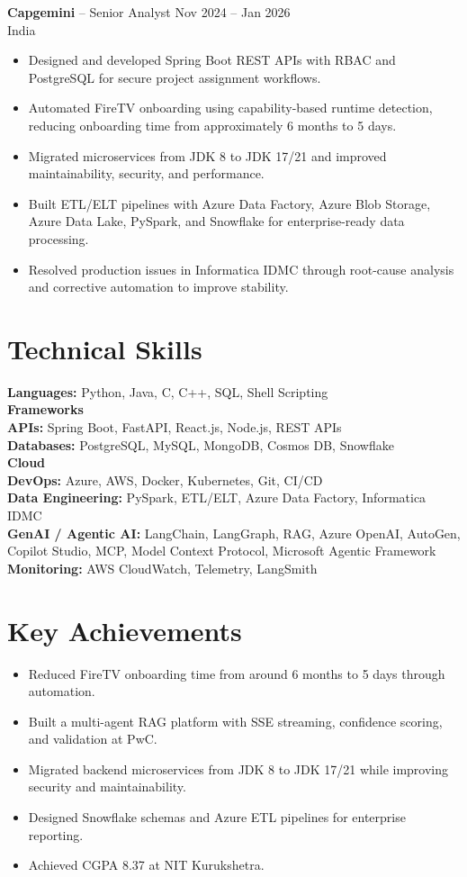 \documentclass[11pt,a4paper]{article}
\begin{document}
\textbf{Capgemini} -- Senior Analyst \hfill Nov 2024 -- Jan 2026\\
India
\begin{itemize}
    \item Designed and developed Spring Boot REST APIs with RBAC and PostgreSQL for secure project assignment workflows.
    \item Automated FireTV onboarding using capability-based runtime detection, reducing onboarding time from approximately 6 months to 5 days.
    \item Migrated microservices from JDK 8 to JDK 17/21 and improved maintainability, security, and performance.
    \item Built ETL/ELT pipelines with Azure Data Factory, Azure Blob Storage, Azure Data Lake, PySpark, and Snowflake for enterprise-ready data processing.
    \item Resolved production issues in Informatica IDMC through root-cause analysis and corrective automation to improve stability.
\end{itemize}

\section*{Technical Skills}
\textbf{Languages:} Python, Java, C, C++, SQL, Shell Scripting\\
\textbf{Frameworks \\ APIs:} Spring Boot, FastAPI, React.js, Node.js, REST APIs\\
\textbf{Databases:} PostgreSQL, MySQL, MongoDB, Cosmos DB, Snowflake\\
\textbf{Cloud \\ DevOps:} Azure, AWS, Docker, Kubernetes, Git, CI/CD\\
\textbf{Data Engineering:} PySpark, ETL/ELT, Azure Data Factory, Informatica IDMC\\
\textbf{GenAI / Agentic AI:} LangChain, LangGraph, RAG, Azure OpenAI, AutoGen, Copilot Studio, MCP, Model Context Protocol, Microsoft Agentic Framework\\
\textbf{Monitoring:} AWS CloudWatch, Telemetry, LangSmith

\section*{Key Achievements}
\begin{itemize}
    \item Reduced FireTV onboarding time from around 6 months to 5 days through automation.
    \item Built a multi-agent RAG platform with SSE streaming, confidence scoring, and validation at PwC.
    \item Migrated backend microservices from JDK 8 to JDK 17/21 while improving security and maintainability.
    \item Designed Snowflake schemas and Azure ETL pipelines for enterprise reporting.
    \item Achieved CGPA 8.37 at NIT Kurukshetra.
\end{itemize}
\end{document}
